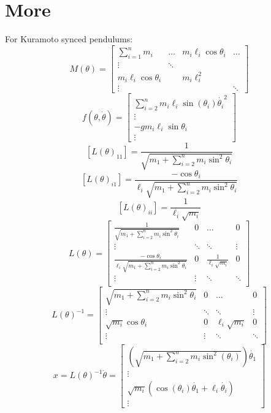 \documentclass[conference]{IEEEtran}
\begin{document}
\section{More}
For Kuramoto synced pendulums:
$$
M(\theta) = \begin{bmatrix}
    \sum\limits_{i=1}^n m_i & \dots & m_i\ell_i\cos\theta_i & \dots\\
    \vdots & \ddots & &\\
    m_i\ell_i\cos\theta_i & & m_i\ell_i^2 &\\
    \vdots & & & \ddots
\end{bmatrix}
$$
$$
f(\theta,\dot{\theta}) = \begin{bmatrix}
    \sum\limits_{i=2}^n m_i\ell_i\sin(\theta_i)\dot{\theta_i}^2\\
    \vdots\\
    -gm_i\ell_i\sin\theta_i\\
    \vdots
\end{bmatrix}
$$
$$[L(\theta)_{11}] = \frac{1}{\sqrt{m_1+\sum\limits_{i=2}^n m_i \sin^2\theta_i}}$$
$$[L(\theta)_{i1}] = \frac{-\cos\theta_i}{\ell_i\sqrt{m_1+\sum\limits_{i=2}^n m_i \sin^2\theta_i}}$$
$$[L(\theta)_{ii}] = \frac{1}{\ell_i\sqrt{m_i}}$$
$$
L(\theta) = \begin{bmatrix}
    \frac{1}{\sqrt{m_1+\sum\limits_{i=2}^n m_i \sin^2\theta_i}} & 0 & \dots & 0\\
    \vdots & \ddots & \ddots & \vdots\\
    \frac{-\cos\theta_i}{\ell_i\sqrt{m_1+\sum\limits_{i=2}^n m_i \sin^2\theta_i}} & 0 & \frac{1}{\ell_i\sqrt{m_i}} & 0\\
    \vdots & \vdots & \ddots & \ddots\\
\end{bmatrix}
$$
$$
L(\theta)^{-1} = \begin{bmatrix}
    \sqrt{m_1+\sum\limits_{i=2}^n m_i \sin^2\theta_i} & 0 & \dots & 0\\
    \vdots & \ddots & \ddots & \vdots\\
    \sqrt{m_i}\cos\theta_i & 0 & \ell_i\sqrt{m_i} & 0\\
    \vdots & \vdots & \ddots & \ddots\\
\end{bmatrix}
$$
$$
x = L(\theta)^{-1}\dot{\theta} = \begin{bmatrix}
    \left(\sqrt{m_1+\sum\limits_{i=2}^n m_i \sin^2(\theta_i)}\right)\dot{\theta_1}\\
    \vdots\\
    \sqrt{m_i}(\cos(\theta_i)\dot{\theta_1} + \ell_i\dot{\theta_i})\\
    \vdots
\end{bmatrix}
$$
\end{document}
